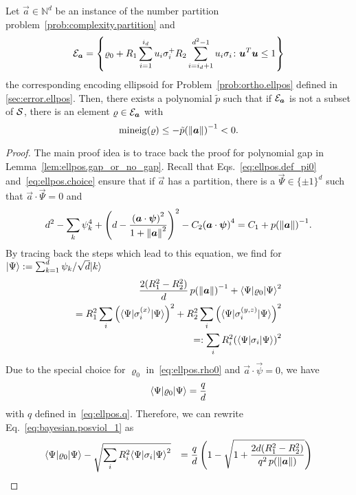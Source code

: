 \begin{lemma}\label{lem:bayesian.positivity_violation}
  Let $\vec a \in \mathbb{N}^d$ be an instance of the number partition problem~\ref{prob:complexity.partition} and
  \[
    \label{eq:bayesian.positivity_violation.ellipsoid}
    \mathcal{E}_{{\boldsymbol{a}}} = \left\{ \varrho_0 + R_1 \sum_{i=1}^{i_d} u_i \sigma_i^ + R_2 \sum_{i=i_d + 1}^{d^2 - 1} u_i \sigma_i \colon {\boldsymbol{u}}^T {\boldsymbol{u}} \le 1 \right\}
  \]
  the corresponding encoding ellipsoid for Problem~\ref{prob:ortho.ellpos} defined in \cref{sec:error.ellpos}.
  Then, there exists a polynomial $\tilde p$ such that if $\mathcal{E}_{{\boldsymbol{a}}}$ is not a subset of $\mathcal{S}$, there is an element $\varrho \in \mathcal{E}_{{\boldsymbol{a}}}$ with
  \[
    \mathrm{mineig}(\varrho) \le -\tilde p{({\Vert{\boldsymbol{a}}\Vert})}^{-1} < 0.
  \]
\end{lemma}
\begin{proof}
  The main proof idea is to trace back the proof for polynomial gap in Lemma~\ref{lem:ellpos.gap_or_no_gap}.
  Recall that Eqs.~\eqref{eq:ellpos.def_pi0} and~\eqref{eq:ellpos.choice} ensure that if $\vec a$ has a partition, there is a $\vec\Psi \in {\{\pm 1\}}^d$ such that $\vec a \cdot \vec\Psi = 0$ and
  \[
    d^2 - \sum_k \psi_k^4 + {\left( d - \frac{{({\boldsymbol{a}} \cdot {\boldsymbol{\psi}})}^2}{1 + {\Vert{\boldsymbol{a}}\Vert}^2} \right)}^2 - C_2 {({\boldsymbol{a}} \cdot {\boldsymbol{\psi}})}^4 = C_1 + p{({\Vert{\boldsymbol{a}}\Vert})}^{-1}.
  \]
  By tracing back the steps which lead to this equation, we find for $\ket{\Psi} := \sum_{k=1}^d \psi_k / \sqrt{d} \ket{k}$
  \begin{align}
    \label{eq:bayesian.posviol_1}
    \frac{2 (R_1^2 - R_2^2)}{d} \, p{(\norm{\vec a})}^{-1} + \bra{\Psi} \varrho_0 \ket{\Psi}^2 \\
    = R_1^2 \sum_i {\left( \bra\Psi \sigma_i^{(x)} \ket\Psi \right)}^2 + R_2^2 \sum_i {\left( \bra\Psi \sigma_i^{(y,z)} \ket\Psi \right)}^2 \\
    =: \sum_i R_i^2 {\left( \bra\Psi \sigma_i \ket\Psi \right)}^2
  \end{align}
  Due to the special choice for $\varrho_0$ in~\eqref{eq:ellpos.rho0} and $\vec a \cdot \vec \psi = 0$, we have
  \[
    \bra\Psi\varrho_0\ket\Psi = \frac{q}{d}
  \]
  with $q$ defined in~\eqref{eq:ellpos.q}.
  Therefore, we can rewrite Eq.~\eqref{eq:bayesian.posviol_1} as
  \begin{align}
    \bra\Psi \varrho_0 \ket\Psi - \sqrt{\sum_i R_i^2 \bra\Psi \sigma_i \ket\Psi^2}
    &&= \frac{q}{d} \left( 1 - \sqrt{1 + \frac{2d (R_1^2 - R_2^2)}{q^2 \, p(\norm{\vec a})}} \right) \nonumber\\

\end{align}
\end{proof}
